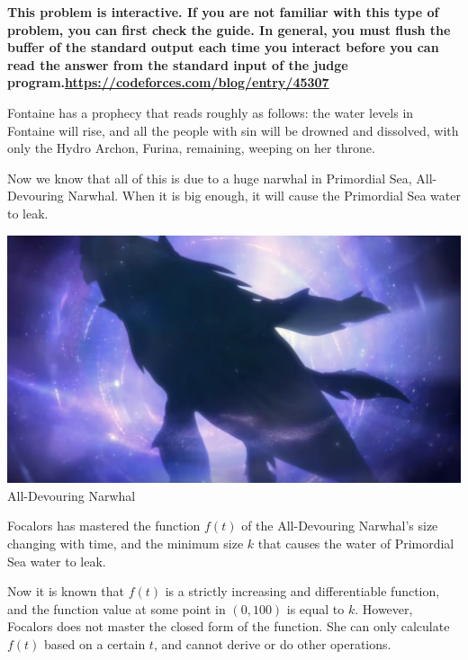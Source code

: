 \textbf {This problem is interactive. If you are not familiar with this type of problem, you can first check the guide. In general, you must flush the buffer of the standard output each time you interact before you can read the answer from the standard input of the judge program.\url{https://codeforces.com/blog/entry/45307}}

Fontaine has a prophecy that reads roughly as follows: the water levels in Fontaine will rise, and all the people with sin will be drowned and dissolved, with only the Hydro Archon, Furina, remaining, weeping on her throne.

Now we know that all of this is due to a huge narwhal in Primordial Sea, All-Devouring Narwhal. When it is big enough, it will cause the Primordial Sea water to leak.

\begin{center}
  \includegraphics[scale=0.4]{whale.jpg} \\
  \small{All-Devouring Narwhal}
\end{center}

Focalors has mastered the function $f(t)$ of the All-Devouring Narwhal's size changing with time, and the minimum size $k$ that causes the water of Primordial Sea water to leak.

Now it is known that $f(t)$ is a strictly increasing and differentiable function, and the function value at some point in $(0, 100)$ is equal to $k$. However, Focalors does not master the closed form of the function. She can only calculate $f(t)$ based on a certain $t$, and cannot derive or do other operations.
